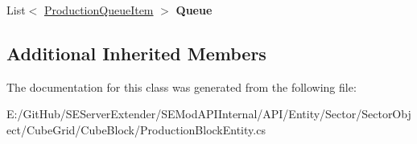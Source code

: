 \begin{DoxyCompactItemize}
\item 
\hypertarget{class_s_e_mod_a_p_i_internal_1_1_a_p_i_1_1_entity_1_1_sector_1_1_sector_object_1_1_cube_grid_1_1ad6cba65b35b2f15d0fc9a7c92190a4b_a9cd539c9eb856b2b37f57bc025867495}{}List$<$ \hyperlink{class_s_e_mod_a_p_i_internal_1_1_a_p_i_1_1_entity_1_1_sector_1_1_sector_object_1_1_cube_grid_1_199e35bb6148552a88d941dc080ac8a36}{Production\+Queue\+Item} $>$ {\bfseries Queue}\label{class_s_e_mod_a_p_i_internal_1_1_a_p_i_1_1_entity_1_1_sector_1_1_sector_object_1_1_cube_grid_1_1ad6cba65b35b2f15d0fc9a7c92190a4b_a9cd539c9eb856b2b37f57bc025867495}

\end{DoxyCompactItemize}
\subsection*{Additional Inherited Members}


The documentation for this class was generated from the following file\+:\begin{DoxyCompactItemize}
\item 
E\+:/\+Git\+Hub/\+S\+E\+Server\+Extender/\+S\+E\+Mod\+A\+P\+I\+Internal/\+A\+P\+I/\+Entity/\+Sector/\+Sector\+Object/\+Cube\+Grid/\+Cube\+Block/Production\+Block\+Entity.\+cs\end{DoxyCompactItemize}
